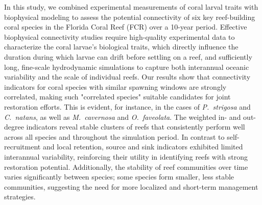 \documentclass[preprint,12pt,authoryear]{elsarticle}
\begin{document}
	In this study, we combined experimental measurements of coral larval traits with biophysical modeling to assess the potential connectivity of six key reef-building coral species in the Florida Coral Reef (FCR) over a 10-year period. Effective biophysical connectivity studies require high-quality experimental data to characterize the coral larvae's biological traits, which directly influence the duration during which larvae can drift before settling on a reef, and sufficiently long, fine-scale hydrodynamic simulations to capture both interannual oceanic variability and the scale of individual reefs. Our results show that connectivity indicators for coral species with similar spawning windows are strongly correlated, making such "correlated species" suitable candidates for joint restoration efforts. This is evident, for instance, in the cases of \textit{P.~strigosa} and \textit{C.~natans}, as well as \textit{M.~cavernosa} and \textit{O.~faveolata}. The weighted in- and out-degree indicators reveal stable clusters of reefs that consistently perform well across all species and throughout the simulation period. In contrast to self-recruitment and local retention, source and sink indicators exhibited limited interannual variability, reinforcing their utility in identifying reefs with strong restoration potential. Additionally, the stability of reef communities over time varies significantly between species; some species form smaller, less stable communities, suggesting the need for more localized and short-term management strategies.
	
\end{document}
